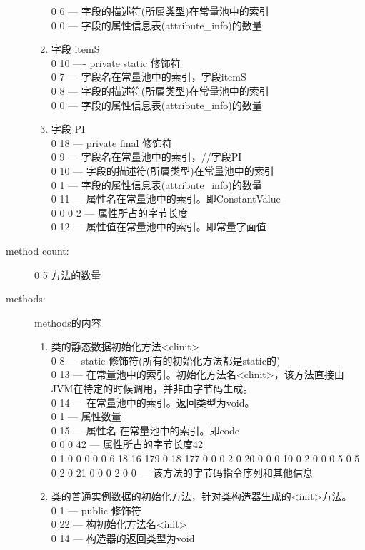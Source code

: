 \begin{description}
\begin{enumerate}
		0 6  --- 字段的描述符(所属类型)在常量池中的索引\\
		0 0  --- 字段的属性信息表(attribute\_info)的数量
	\item 字段 itemS\\
		0 10 ---- private static 修饰符\\
		0 7  --- 字段名在常量池中的索引，字段itemS\\
		0 8  --- 字段的描述符(所属类型)在常量池中的索引\\
		0 0  --- 字段的属性信息表(attribute\_info)的数量
	\item 字段 PI\\
		0 18 --- private final 修饰符\\
		0 9  --- 字段名在常量池中的索引，//字段PI\\
		0 10 --- 字段的描述符(所属类型)在常量池中的索引\\
		0 1  --- 字段的属性信息表(attribute\_info)的数量\\
		0 11 --- 属性名在常量池中的索引。即ConstantValue\\
		0 0 0 2 --- 属性所占的字节长度\\
		0 12 --- 属性值在常量池中的索引。即常量字面值
	\end{enumerate}
\item [method count:] 0 5 方法的数量
\item [methods:] methods的内容
	\begin{enumerate}
	\item 类的静态数据初始化方法<clinit>\\
		0 8  --- static 修饰符(所有的初始化方法都是static的)\\
		0 13 --- 在常量池中的索引。初始化方法名<clinit>，该方法直接由JVM在特定的时候调用，并非由字节码生成。\\
		0 14 --- 在常量池中的索引。返回类型为void。\\
		0 1  --- 属性数量\\
		0 15 --- 属性名 在常量池中的索引。即code\\
		0 0 0 42 ---  属性所占的字节长度42\\
		0 1 0 0 0 0 0 6 18 16 179 0 18 177 0 0 0 2 0 20 0 0 0 10 0 2 0 0 0 5 0 5 0 2 0 21 0 0 0 2 0 0 --- 该方法的字节码指令序列和其他信息
	\item 类的普通实例数据的初始化方法，针对类构造器生成的<init>方法。\\
		0 1  --- public 修饰符\\
		0 22 --- 构初始化方法名<init>\\
		0 14 --- 构造器的返回类型为void\\

\end{enumerate}
\end{description}
